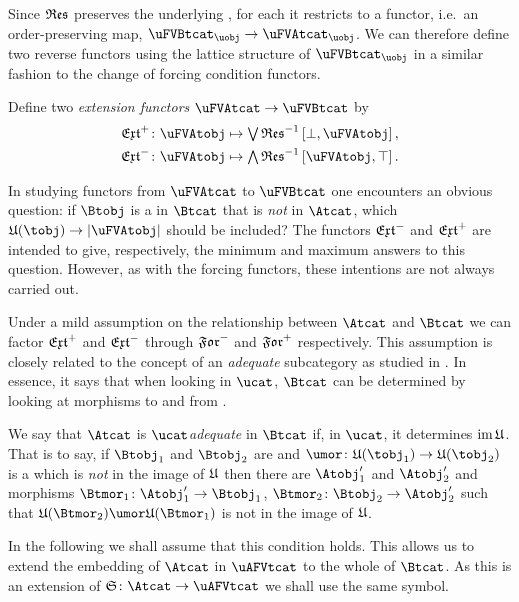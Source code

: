 \documentclass[%
a4paper,%
arxiv,%
defaults
]{myclass}
\begin{document}
Since \(\resfunc\) preserves the underlying \uobjs, for each \uobj[\uobj] it restricts to a functor, i.e.\ an order\hyp{}preserving map, \(\uFVBtcat_{\uobj} \to \uFVAtcat_{\uobj}\).
We can therefore define two reverse functors using the lattice structure of \(\uFVBtcat_{\uobj}\) in a similar fashion to the change of forcing condition functors.

\begin{defn}
Define two \emph{extension functors} \(\uFVAtcat \to \uFVBtcat\) by
%
\begin{align*}
  \Jextfunc \colon \uFVAtobj &\mapsto \join \resfunc^{-1}\left[\bot,\uFVAtobj\right], \\
%
  \Mextfunc \colon \uFVAtobj &\mapsto \meet \resfunc^{-1}\left[\uFVAtobj,\top\right].
\end{align*}
\end{defn}

In studying functors from \(\uFVAtcat\) to \(\uFVBtcat\) one encounters an obvious question: if \(\Btobj\) is a \Btobj in \(\Btcat\) that is \emph{not} in \(\Atcat\), which \umors \(\ufunc(\tobj) \to \forfunc[\uFVAtobj]\) should be included?
The functors \(\Mextfunc\) and \(\Jextfunc\) are intended to give, respectively, the minimum and maximum answers to this question.
However, as with the forcing functors, these intentions are not always carried out.

Under a mild assumption on the relationship between \(\Atcat\) and \(\Btcat\) we can factor \(\Jextfunc\) and \(\Mextfunc\) through \(\Jforfunc\) and \(\Mforfunc\) respectively.
This assumption is closely related to the concept of an \emph{adequate} subcategory as studied in \cite{ji3}.
In essence, it says that when looking in \(\ucat\), \(\Btcat\) can be determined by looking at morphisms to and from \Atobjalts.

\begin{defn}
We say that \(\Atcat\) is \emph{\(\ucat\)\enhyp{}adequate} in \(\Btcat\) if, in \(\ucat\), it determines \(\im \ufunc\).
That is to say, if \(\Btobj_1\) and \(\Btobj_2\) are \Btobjalts and \(\umor \colon \ufunc(\tobj_1) \to \ufunc(\tobj_2)\) is a \umor which is \emph{not} in the image of \(\ufunc\) then there are \Atobjalts \(\Atobj_1'\) and \(\Atobj_2'\) and morphisms \(\Btmor_1 \colon \Atobj_1' \to \Btobj_1\), \(\Btmor_2 \colon \Btobj_2 \to \Atobj_2'\) such that \(\ufunc(\Btmor_2) \umor \ufunc(\Btmor_1)\) is not in the image of \(\ufunc\).
\end{defn}

In the following we shall assume that this condition holds.
This allows us to extend the embedding of \(\Atcat\) in \(\uAFVtcat\) to the whole of \(\Btcat\).
As this is an extension of \(\sfunc \colon \Atcat \to \uAFVtcat\) we shall use the same symbol.
\end{document}
